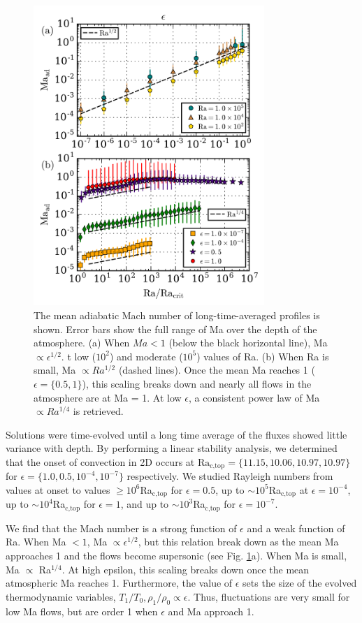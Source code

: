 \documentclass[aps, prl, twocolumn, nofootinbib, groupedaddress, amsfonts, amssymb, amsmath]{revtex4-1}
\begin{document}
\begin{figure}[t]
\includegraphics[width=3.4375in]{./figs/ma_v_Ra.png}
\caption{The mean adiabatic Mach number of long-time-averaged profiles
is shown.  Error bars show the full range of Ma over the depth of the
atmosphere.
(a) When $Ma < 1$ (below the black horizontal line), 
Ma $\propto \epsilon^{1/2}$.
t low ($10^2$) and moderate ($10^5$) values of Ra.
(b) When Ra is small, Ma $\propto Ra^{1/2}$ (dashed lines).
Once the mean Ma reaches 1 ($\epsilon = \{0.5, 1\}$), this scaling breaks down
and nearly all flows in the atmosphere are at Ma = 1.
At low $\epsilon$, a consistent power law of Ma $\propto Ra^{1/4}$ is retrieved.
\label{fig:ma_v_eps} }
\end{figure}


Solutions were time-evolved until a long time average of the fluxes
showed little
variance with depth. By performing a linear stability analysis, 
we determined that the onset of convection in 2D
occurs at $\text{Ra}_{\text{c,top}} = \{11.15, 10.06, 10.97, 10.97\}$ 
for $\epsilon = \{1.0, 0.5, 10^{-4}, 10^{-7}\}$ respectively.  
We studied Rayleigh
numbers from values at onset to values $\geq 10^6$Ra$_{\text{c,top}}$ 
for $\epsilon = 0.5$, up to
$\sim 10^5$Ra$_{\text{c,top}}$ at $\epsilon = 10^{-4}$, 
up to $\sim 10^4$Ra$_{\text{c,top}}$ for $\epsilon = 1$,
and up to $\sim 10^3$Ra$_{\text{c,top}}$ for $\epsilon = 10^{-7}$.

We find that the Mach number is a strong function of 
$\epsilon$ and a weak function of Ra.  
When Ma $< 1$, Ma $\propto \epsilon^{1/2}$, 
but this relation break down as the mean
Ma approaches 1 and the flows become supersonic (see Fig. \ref{fig:ma_v_eps}a).  
When Ma is small,
Ma $\propto$ Ra$^{1/4}$.  At high epsilon, 
this scaling breaks down once the mean atmospheric Ma reaches 1.
Furthermore, the value of $\epsilon$ sets the size of the
evolved thermodynamic variables, 
$T_1/T_0, \rho_1/\rho_0 \propto \epsilon$.  Thus, fluctuations
are very small for low Ma flows, 
but are order 1 when $\epsilon$ and Ma approach 1.
\end{document}
